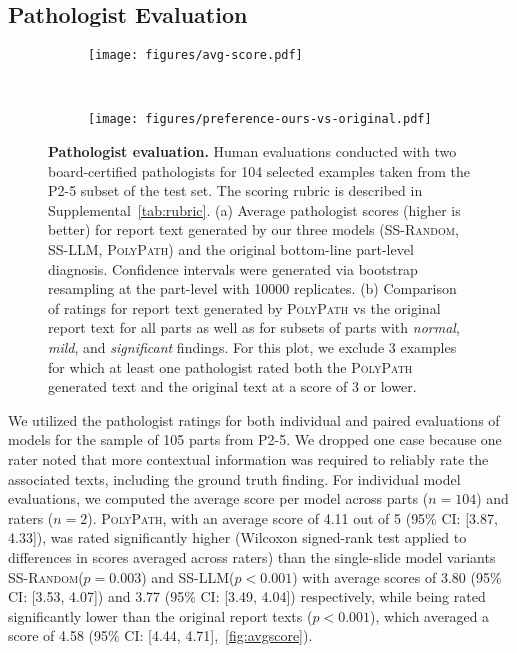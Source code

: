 \documentclass[11pt]{article}
\newcommand{\ourmodel}{\textsc{PolyPath}\xspace}
\newcommand{\randommodel}{\textsc{SS-Random}\xspace}
\newcommand{\llmmodel}{\textsc{SS-LLM}\xspace}
\begin{document}
\subsection{Pathologist Evaluation}
\label{sec:human_evals}
\begin{figure}[t]
\centering
  \begin{subfigure}[b]{\textwidth}
    \centering
    \texttt{[image: figures/avg-score.pdf]}
    \caption{}
    \label{fig:avgscore}
  \end{subfigure}
  \\
  \begin{subfigure}[b]{\textwidth}
  \centering
  \texttt{[image: figures/preference-ours-vs-original.pdf]}
  \caption{}
  \label{fig:preferenceoursvsoriginal}
  \end{subfigure}
\caption{\small \textbf{Pathologist evaluation.} Human evaluations conducted with two board-certified pathologists for 104 selected examples taken from the P2-5 subset of the test set. The scoring rubric is described in Supplemental~\autoref{tab:rubric}. (a) Average pathologist scores (higher is better) for report text generated by our three models (\randommodel, \llmmodel, \ourmodel) and the original bottom-line part-level diagnosis. Confidence intervals were generated via bootstrap resampling at the part-level with 10000 replicates. (b) Comparison of ratings for report text generated by \ourmodel vs the original report text for all parts as well as for subsets of parts with \emph{normal}, \emph{mild}, and \emph{significant} findings. For this plot, we exclude 3 examples for which at least one pathologist rated both the \ourmodel generated text and the original text at a score of 3 or lower.}
\label{fig:pathologistresults}
\end{figure}
We utilized the pathologist ratings for both individual and paired evaluations of models for the sample of 105 parts from P2-5. We dropped one case because one rater noted that more contextual information was required to reliably rate the associated texts, including the ground truth finding. For individual model evaluations, we computed the average score per model across parts ($n=104$) and raters ($n=2$). \ourmodel, with an average score of 4.11 out of 5 (95\% CI: [3.87, 4.33]), was rated significantly higher (Wilcoxon signed-rank test applied to differences in scores averaged across raters) than the single-slide model variants \randommodel ($p=0.003$) and \llmmodel ($p < 0.001$) with average scores of 3.80 (95\% CI: [3.53, 4.07]) and 3.77 (95\% CI: [3.49, 4.04]) respectively, while being rated significantly lower than the original report texts ($p < 0.001$), which averaged a score of 4.58 (95\% CI: [4.44, 4.71],~\autoref{fig:avgscore}). \\ \\
\end{document}

